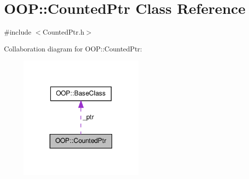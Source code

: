 \hypertarget{classOOP_1_1CountedPtr}{\section{\-O\-O\-P\-:\-:\-Counted\-Ptr \-Class \-Reference}
\label{classOOP_1_1CountedPtr}
}


{\ttfamily \#include $<$\-Counted\-Ptr.\-h$>$}



\-Collaboration diagram for \-O\-O\-P\-:\-:\-Counted\-Ptr\-:\nopagebreak
\begin{figure}[H]
\begin{center}
\leavevmode
\includegraphics[width=174pt]{classOOP_1_1CountedPtr__coll__graph}
\end{center}
\end{figure}
